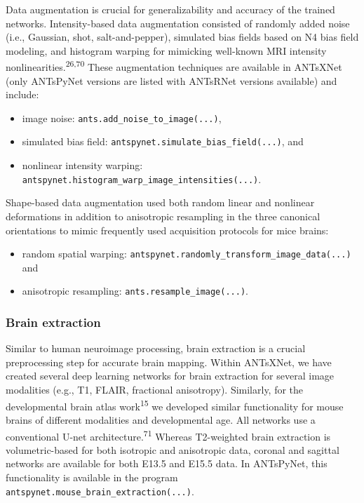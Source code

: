 \documentclass[
  12pt,
]{article}
\begin{document}
Data augmentation is crucial for generalizability and accuracy of the
trained networks. Intensity-based data augmentation consisted of
randomly added noise (i.e., Gaussian, shot, salt-and-pepper), simulated
bias fields based on N4 bias field modeling, and histogram warping for
mimicking well-known MRI intensity
nonlinearities.\textsuperscript{26,70} These augmentation techniques are
available in ANTsXNet (only ANTsPyNet versions are listed with ANTsRNet
versions available) and include:

\begin{itemize}
\item
  image noise: \texttt{ants.add\_noise\_to\_image(...)},
\item
  simulated bias field: \texttt{antspynet.simulate\_bias\_field(...)},
  and
\item
  nonlinear intensity warping:
  \texttt{antspynet.histogram\_warp\_image\_intensities(...)}.
\end{itemize}

Shape-based data augmentation used both random linear and nonlinear
deformations in addition to anisotropic resampling in the three
canonical orientations to mimic frequently used acquisition protocols
for mice brains:

\begin{itemize}
\item
  random spatial warping:
  \texttt{antspynet.randomly\_transform\_image\_data(...)} and
\item
  anisotropic resampling: \texttt{ants.resample\_image(...)}.
\end{itemize}

\hypertarget{brain-extraction}{%
\subsubsection{Brain extraction}\label{brain-extraction}}

Similar to human neuroimage processing, brain extraction is a crucial
preprocessing step for accurate brain mapping. Within ANTsXNet, we have
created several deep learning networks for brain extraction for several
image modalities (e.g., T1, FLAIR, fractional anisotropy). Similarly,
for the developmental brain atlas work\textsuperscript{15} we developed
similar functionality for mouse brains of different modalities and
developmental age. All networks use a conventional U-net
architecture.\textsuperscript{71} Whereas T2-weighted brain extraction
is volumetric-based for both isotropic and anisotropic data, coronal and
sagittal networks are available for both E13.5 and E15.5 data. In
ANTsPyNet, this functionality is available in the program
\texttt{antspynet.mouse\_brain\_extraction(...)}.
\end{document}

